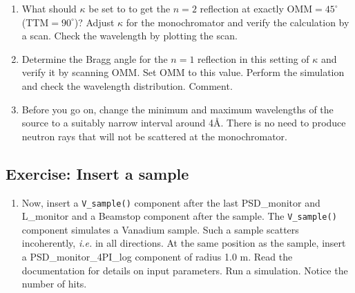 \begin{enumerate}
\item{What should $\kappa$ be set to to get the $n=2$ reflection at exactly OMM$=45^\circ$ (TTM$=90^\circ$)? Adjust $\kappa$ for the monochromator and verify the calculation by a scan. Check the wavelength by plotting the scan.}
\item{Determine the Bragg angle for the $n=1$ reflection in this setting of $\kappa$ and verify it by scanning OMM. Set OMM to this value. Perform the simulation and check the wavelength distribution. Comment.}
\item{Before you go on, change the minimum and maximum wavelengths of the source to a suitably narrow interval around 4\AA. There is no need to produce neutron rays that will not be scattered at the monochromator.}
\end{enumerate}
\subsection{Exercise: Insert a sample}
\begin{enumerate}
\item{Now, insert a \verb+V_sample()+ component after the last PSD\_monitor and L\_monitor and a Beamstop component after the sample. The \verb+V_sample()+ component simulates a Vanadium sample. Such a sample scatters incoherently, \emph{i.e.} in all directions. At the same position as the sample, insert a PSD\_monitor\_4PI\_log component of radius 1.0 m. Read the documentation for details on input parameters. Run a simulation. Notice the number of hits.}
\end{enumerate}
